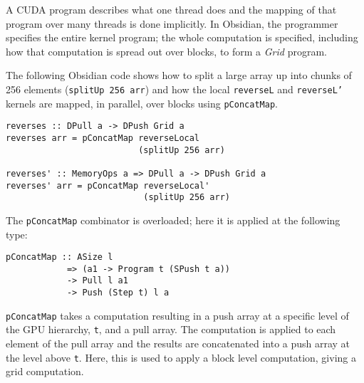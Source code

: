 

A CUDA program describes what one thread does and the mapping of that 
program over many threads is done implicitly.
In Obsidian, the programmer specifies the entire kernel
program;  the whole computation is specified, including how that computation 
is spread out over blocks, to form a {\em Grid} program. 

The following Obsidian code shows how to split a large array up into 
chunks of 256 elements ({\tt splitUp 256 arr}) and how the local {\tt reverseL} 
and {\tt reverseL'} kernels are  mapped, in parallel, over blocks using {\tt pConcatMap}. 

\begin{small} 
\begin{verbatim} 
reverses :: DPull a -> DPush Grid a
reverses arr = pConcatMap reverseLocal
                          (splitUp 256 arr) 

reverses' :: MemoryOps a => DPull a -> DPush Grid a
reverses' arr = pConcatMap reverseLocal'
                           (splitUp 256 arr) 
\end{verbatim} 
\end{small} 

\noindent
The {\tt pConcatMap} combinator is overloaded; here it is applied 
at the following type: 
\begin{small}
\begin{Verbatim}[samepage=true] 
pConcatMap :: ASize l 
            => (a1 -> Program t (SPush t a))
            -> Pull l a1 
            -> Push (Step t) l a
\end{Verbatim}
\end{small}

{\tt pConcatMap} takes a computation resulting in a push array at a specific 
level of the GPU hierarchy, {\tt t}, and a pull array. The computation 
is applied to each element of the pull array and the results are concatenated 
into a push array at the level above {\tt t}. Here, this is used to apply a block 
level computation, giving a grid computation. 


